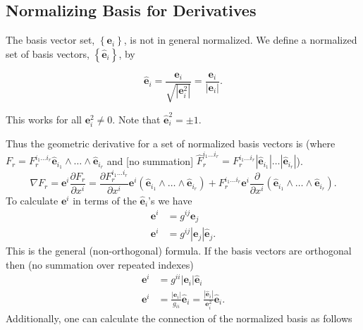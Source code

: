 \documentclass[12pt]{report}
\newcommand{\bm}[1]{\boldsymbol{#1}}
\newcommand{\bfrac}[2]{\displaystyle\frac{#1}{#2}}
\newcommand{\lp}{\left (}
\newcommand{\rp}{\right )}
\newcommand{\abs}[1]{\left |{#1}\right |}
\newcommand{\pdiff}[2]{\bfrac{\partial {#1}}{\partial {#2}}}
\newcommand{\lbrc}{\left \{}
\newcommand{\rbrc}{\right \}}
\newcommand{\set}[1]{\lbrc {#1} \rbrc}
\newcommand{\W}{\wedge}
\newcommand{\paren}[1]{\lp {#1} \rp}
\newcommand{\be}{\begin{equation}}
\newcommand{\ee}{\end{equation}}
\newcommand{\eb}{\bm{e}}
\begin{document}
\subsection{Normalizing Basis for Derivatives}

The basis vector set, $\set{\bm{e}_{i}}$, is not in general normalized.  We define a normalized set of basis
vectors, $\set{\bm{\hat{e}}_{i}}$, by

\begin{equation}
    \bm{\hat{e}}_{i} = \bfrac{\bm{e}_{i}}{\sqrt{\abs{\bm{e}_{i}^{2}}}} = \bfrac{\bm{e}_{i}}{\abs{\bm{e}_{i}}}.
\end{equation}

This works for all $\bm{e}_{i}^{2} \neq 0$.  Note that  $\bm{\hat{e}}_{i}^{2} = \pm 1$.

Thus the geometric derivative for a set of normalized basis vectors is (where
$F_{r} = F_{r}^{i_{1}\dots i_{r}} \bm{\hat{e}}_{i_{1}}\W\dots\W\bm{\hat{e}}_{i_{r}}$ and [no summation]
$\hat{F}_{r}^{i_{1}\dots i_{r}} = F_{r}^{i_{1}\dots i_{r}} \abs{\bm{\hat{e}}_{i_{1}}}\dots\abs{\bm{\hat{e}}_{i_{r}}}$).
\be
    \nabla F_{r} = \eb^{i}\pdiff{F_{r}}{x^{i}} =
                   \pdiff{F_{r}^{i_{1}\dots i_{r}}}{x^{i}}\bm{e}^{i}
                   \paren{\bm{\hat{e}}_{i_{1}}\W\dots\W\bm{\hat{e}}_{i_{r}}}
                    +F_{r}^{i_{1}\dots i_{r}}\bm{e}^{i}\pdiff{}{x^{i}}
                    \paren{\bm{\hat{e}}_{i_{1}}\W\dots\W\bm{\hat{e}}_{i_{r}}}.
\ee
To calculate $\bm{e}^{i}$ in terms of the $\bm{\hat{e}}_{i}$'s we have
\begin{align}
    \bm{e}^{i} &= g^{ij}\bm{e}_{j} \nonumber \\
    \bm{e}^{i} &= g^{ij}\abs{\bm{e}_{j}}\bm{\hat{e}}_{j}.
\end{align}
This is the general (non-orthogonal) formula.  If the basis vectors are orthogonal then (no summation over repeated indexes)
\begin{align}
    \bm{e}^{i} &= g^{ii}\abs{\bm{e}_{i}}\bm{\hat{e}}_{i} \nonumber \\
    \bm{e}^{i} &= \bfrac{\abs{\bm{e}_{i}}}{g_{ii}}\bm{\hat{e}}_{i} = \bfrac{\abs{\bm{\hat{e}}_{i}}}{\bm{e}_{i}^{2}}\bm{\hat{e}}_{i}.
\end{align}
Additionally, one can calculate the connection of the normalized basis as follows
\end{document}
